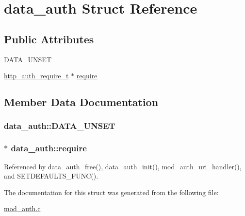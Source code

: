 \hypertarget{structdata__auth}{\section{data\-\_\-auth Struct Reference}
\label{structdata__auth}
}
\subsection*{Public Attributes}
\begin{DoxyCompactItemize}
\item 
\hyperlink{structdata__auth_afb3935bd3ce89cf6f35132ee6906770a}{D\-A\-T\-A\-\_\-\-U\-N\-S\-E\-T}
\item 
\hyperlink{structhttp__auth__require__t}{http\-\_\-auth\-\_\-require\-\_\-t} $\ast$ \hyperlink{structdata__auth_a29a8284ef6d68b61010e39f2b0cf392b}{require}
\end{DoxyCompactItemize}


\subsection{Member Data Documentation}
\hypertarget{structdata__auth_afb3935bd3ce89cf6f35132ee6906770a}{
\subsubsection[{D\-A\-T\-A\-\_\-\-U\-N\-S\-E\-T}]{\setlength{\rightskip}{0pt plus 5cm}data\-\_\-auth\-::\-D\-A\-T\-A\-\_\-\-U\-N\-S\-E\-T}}\label{structdata__auth_afb3935bd3ce89cf6f35132ee6906770a}
\hypertarget{structdata__auth_a29a8284ef6d68b61010e39f2b0cf392b}{
\subsubsection[{require}]{$\ast$ data\-\_\-auth\-::require}}\label{structdata__auth_a29a8284ef6d68b61010e39f2b0cf392b}


Referenced by data\-\_\-auth\-\_\-free(), data\-\_\-auth\-\_\-init(), mod\-\_\-auth\-\_\-uri\-\_\-handler(), and S\-E\-T\-D\-E\-F\-A\-U\-L\-T\-S\-\_\-\-F\-U\-N\-C().



The documentation for this struct was generated from the following file\-:\begin{DoxyCompactItemize}
\item 
\hyperlink{mod__auth_8c}{mod\-\_\-auth.\-c}\end{DoxyCompactItemize}
